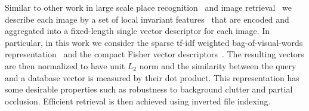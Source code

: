   Similar to other work in large scale place recognition~\cite{Cummins09,Knopp2010,Schindler07,Torii2013} and image retrieval~\cite{Nister06,Philbin07,Sivic2003,Jegou12} we describe each image by a set of local invariant features~\cite{Bay06,Lowe04}
  that are encoded and aggregated into a fixed-length single vector descriptor for each image. In particular, in this work we consider the sparse tf-idf weighted bag-of-visual-words representation~\cite{Sivic2003,Philbin07} and the compact Fisher vector descriptors~\cite{Jegou12}.  
The resulting vectors are then normalized to have unit $L_2$ norm and the similarity between the query and a database vector is measured by their dot product. This representation has some desirable properties such as robustness to background clutter and partial occlusion. Efficient retrieval is then achieved using inverted file indexing.



